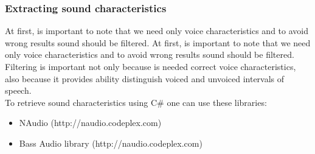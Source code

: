 \documentclass[12pt, letterpaper]{article}
\begin{document}
\subsubsection{Extracting sound characteristics}
At first, is important to note that we need only voice characteristics and to avoid wrong results sound should be filtered. At first, is important to note that we need only voice characteristics and to avoid wrong results sound should be filtered. Filtering is important not only because is needed correct voice characteristics, also because it provides ability distinguish voiced and unvoiced intervals of speech. 
\\

To retrieve sound characteristics using C\# one can use these libraries:
\begin{itemize}
	\item NAudio (http://naudio.codeplex.com)
	\item Bass Audio library (http://naudio.codeplex.com)
\end{itemize}
\end{document}
